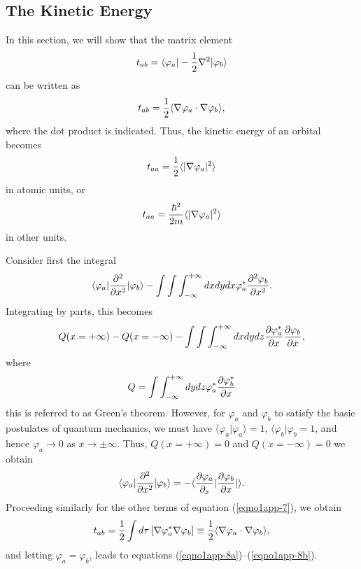 \subsection{The Kinetic Energy}
\label{app-b}

In this section, we will show that the matrix element
\begin{equation}
t_{ab} = \langle \varphi_a \vert - {1 \over 2} \nabla^2 \vert
\varphi_b\rangle
\label{eqno1app-7}
\end{equation}
can be written as
\begin{equation}
t_{ab} = {1 \over 2} \langle \nabla \varphi_a \cdot \nabla \varphi_b \rangle ,
\end{equation}
where the dot product is indicated. Thus, the kinetic energy of an orbital
becomes
\begin{equation}
t_{aa} = {1 \over 2} \langle \vert \nabla \varphi_a \vert^2 \rangle
\label{eqno1app-8a}
\end{equation}
in atomic units, or
\begin{equation}
t_{aa} = {\hbar^2 \over 2m} \langle \vert \nabla \varphi_a \vert^2 
\rangle
\label{eqno1app-8b}
\end{equation}
in other units.

Consider first the integral
\begin{equation}
\langle \varphi_a \vert {\partial^2 \over \partial x^2} \vert 
\varphi_b \rangle - \int \int \int^{+ \infty}_{- \infty} d x d y d x 
\varphi ^*_a {\partial^2 \varphi_b \over \partial x^2}.
\end{equation}
Integrating by parts, this becomes
\begin{equation}
Q(x = + \infty ) - Q ( x = - \infty) - \int \int \int^{+ \infty}_{- 
\infty} d x d y d z {\partial \varphi^*_a \over \partial x} {\partial 
\varphi_b \over \partial x},
\end{equation}
where
\begin{equation}
Q = \int \int^{+ \infty}_{- \infty} d y d z \varphi ^*_a {\partial 
\varphi^*_b \over \partial x}
\end{equation}
this is referred to as Green's theorem.  However, for $\varphi_a$ and 
$\varphi_b$ to satisfy the basic postulates of quantum mechanics, we must 
have $ \langle \varphi_a | \varphi_a \rangle = 1$, $\langle \varphi_b | \varphi_b = 1$, 
and hence $\varphi_a \rightarrow 0$ as $x \rightarrow \pm \infty$.  
Thus, $Q ( x = + \infty) = 0$ and $Q ( x = - \infty) = 0$ we obtain
\begin{equation}
\langle \varphi_a \vert {\partial^2 \over \partial x^2} \vert 
\varphi_b \rangle = - \langle {\partial \varphi_a \over \partial_x} 
\vert {\partial \varphi_b \over \partial x} \vert \rangle .
\end{equation}
Proceeding similarly for the other terms of equation
(\ref{eqno1app-7}), we obtain
\begin{equation}
t_{ab} = {1 \over 2} \int d \tau \left[ \nabla \varphi ^*_a \nabla 
\varphi_b \right] \equiv {1 \over 2} \langle \nabla \varphi_a \cdot \nabla 
\varphi_b \rangle ,
\end{equation}
and letting $\varphi_a = \varphi_b$, leads to equations
(\ref{eqno1app-8a})--(\ref{eqno1app-8b}).

